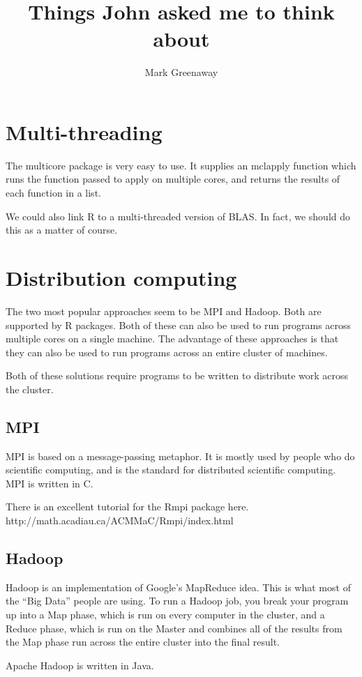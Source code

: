 \documentclass{amsart}
\title{Things John asked me to think about}
\author{Mark Greenaway}
\begin{document}
\maketitle
\section{Multi-threading}
The multicore package is very easy to use. It supplies an mclapply function which
runs the function passed to apply on multiple cores, and returns the results of each
function in a list.

We could also link R to a multi-threaded version of BLAS. In fact, we should do this
as a matter of course.

\section{Distribution computing}
The two most popular approaches seem to be MPI and Hadoop. Both are supported by R
packages. Both of these can also be used to run programs across multiple cores on
a single machine. The advantage of these approaches is that they can also be used to
run programs across an entire cluster of machines.

Both of these solutions require programs to be written to distribute work across
the cluster.

\subsection{MPI}
MPI is based on a message-passing metaphor. It is mostly used by people who do
scientific computing, and is the standard for distributed scientific computing.
MPI is written in C.

There is an excellent tutorial for the Rmpi package here.
http://math.acadiau.ca/ACMMaC/Rmpi/index.html

\subsection{Hadoop}
Hadoop is an implementation of Google's MapReduce idea. This is what most of the 
``Big Data'' people are using. To run a Hadoop job, you break your program up into
a Map phase, which is run on every computer in the cluster, and a Reduce phase,
which is run on the Master and combines all of the results from the Map phase
run across the entire cluster into the final result.

Apache Hadoop is written in Java.
\end{document}
